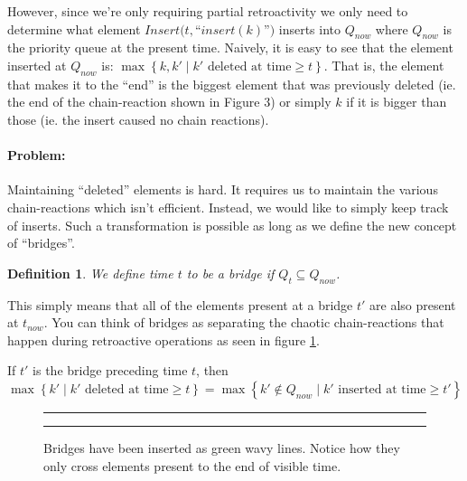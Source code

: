 \documentclass[11pt]{article}
\newtheorem{definition}[theorem]{Definition}
\begin{document}
However, since we're only requiring partial retroactivity we only need to determine what element $Insert(t,$``$insert(k)$''$)$ inserts into $Q_{now}$ where $Q_{now}$ is the priority queue at the present time.  Naively, it is easy to see that the element inserted at $Q_{now}$ is: $\max\left\{k,k' \mid k' \text{ deleted at time} \ge t\right\}$.  That is, the element that makes it to the ``end'' is the biggest element that was previously deleted (ie. the end of the chain-reaction shown in Figure 3) or simply $k$ if it is bigger than those (ie. the insert caused no chain reactions).

\paragraph{Problem:} Maintaining ``deleted'' elements is hard.  It requires us to maintain the various chain-reactions which isn't efficient.  Instead, we would like to simply keep track of inserts.  Such a transformation is possible as long as we define the new concept of ``bridges''.

\begin{definition}
	We define time $t$ to be a bridge if $Q_t \subseteq Q_{now}$.
\end{definition}

This simply means that all of the elements present at a bridge $t'$ are also present at $t_{now}$.  You can think of bridges as separating the chaotic chain-reactions that happen during retroactive operations as seen in figure \ref{fig-pqbridge}.

If $t'$ is the bridge preceding time $t$, then \\ $\max \left\{ k' \mid k' \text{ deleted at time} \ge t \right\} = \max \left\{ k' \notin Q_{now} \mid k' \text{ inserted at time} \ge t' \right\}$


\begin{figure}[ht]
	\rule{\textwidth}{0.005in}
  \begin{center}
  \end{center}

  \caption{\small Bridges have been inserted as green wavy lines. Notice how they only cross elements present to the end of visible time.}
  \label{fig-pqbridge}
	\rule{\textwidth}{0.005in}
\end{figure}
\end{document}
